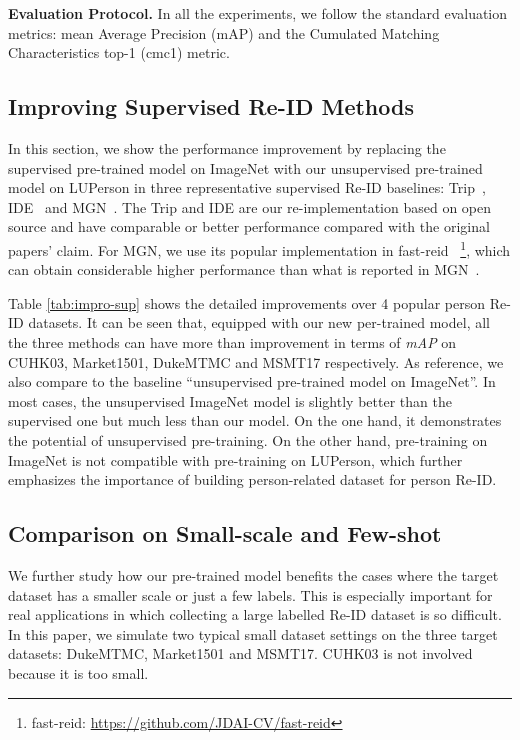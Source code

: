 \documentclass[final]{cvpr}
\begin{document}
\noindent\textbf{Evaluation Protocol.} In all the experiments, we follow the standard evaluation metrics: mean Average Precision (mAP) and the Cumulated Matching Characteristics top-1 (cmc1) metric.

\subsection{Improving Supervised Re-ID Methods}
In this section, we show the performance improvement by replacing the supervised pre-trained model on ImageNet with our unsupervised pre-trained model on LUPerson in three representative supervised Re-ID baselines: Trip~\cite{hermans2017defense}, IDE~\cite{zheng2017person} and MGN~\cite{wang2018learning}. The Trip and IDE are our re-implementation based on open source and have comparable or better performance compared with the original papers' claim. For MGN, we use its popular implementation in fast-reid~\cite{he2020fastreid} \footnote{fast-reid: \url{https://github.com/JDAI-CV/fast-reid}}, which can obtain considerable higher performance than what is reported in MGN~\cite{wang2018learning}.

Table \ref{tab:impro-sup} shows the detailed improvements over 4 popular person Re-ID datasets. It can be seen that, equipped with our new per-trained model, all the three methods can have more than  improvement in terms of \emph{mAP} on CUHK03, Market1501, DukeMTMC and MSMT17 respectively. As reference, we also compare to the baseline ``unsupervised pre-trained model on ImageNet''. In most cases, the unsupervised ImageNet model is slightly better than the supervised one but much less than our model. On the one hand, it demonstrates the potential of unsupervised pre-training. On the other hand, pre-training on ImageNet is not compatible with pre-training on LUPerson, which further emphasizes the importance of building person-related dataset for person Re-ID.

\subsection{Comparison on Small-scale and Few-shot}

We further study how our pre-trained model benefits the cases where the target dataset has a smaller scale or just a few labels. This is especially important for real applications in which collecting a large labelled Re-ID dataset is so difficult. In this paper, we simulate two typical small dataset settings on the three target datasets: DukeMTMC, Market1501 and MSMT17. CUHK03 is not involved because it is too small.
\end{document}
